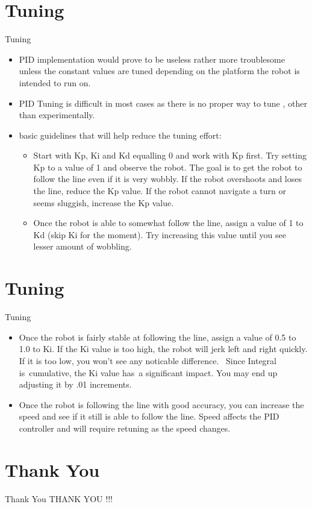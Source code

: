 \documentclass[10pt, a4paper]{beamer}
\begin{document}
	\section{Tuning}
		\begin{frame}{Tuning}
			\begin{itemize}
			\item PID implementation would prove to be useless rather more troublesome unless the constant values are tuned depending on the platform the robot is intended to run on.
			\item PID Tuning is difficult in most cases as there is no proper way to tune , other than experimentally.
			\item basic guidelines that will help reduce the tuning effort:
			\begin{itemize}
			\item \text Start with Kp, Ki and Kd equalling 0 and work with Kp first. Try setting Kp to a value of 1 and observe the robot. The goal is to get the robot to follow the line even if it is very wobbly. If the robot overshoots and loses the line, reduce the Kp value. If the robot cannot navigate a turn or seems sluggish, increase the Kp value.
			\item \text Once the robot is able to somewhat follow the line, assign a value of 1 to Kd (skip Ki for the moment). Try increasing this value until you see lesser amount of wobbling. 
			\end{itemize}
		\end{itemize}
	\end{frame}	
	
	
	\section{Tuning}
		\begin{frame}{Tuning}
			\begin{itemize}
		\item \text Once the robot is fairly stable at following the line, assign a value of 0.5 to 1.0 to Ki. If the Ki value is too high, the robot will jerk left and right quickly. If it is too low, you won't see any noticable difference.  Since Integral is cumulative, the Ki value has a significant impact. You may end up adjusting it by .01 increments. \\
		
		\item \text Once the robot is following the line with good accuracy, you can increase the speed and see if it still is able to follow the line. Speed affects the PID controller and will require retuning as the speed changes.
			\end{itemize}
		\end{frame}


	\section{Thank You}
	\begin{frame}{Thank You}
		\centering THANK YOU !!!
	\end{frame}
\end{document}
